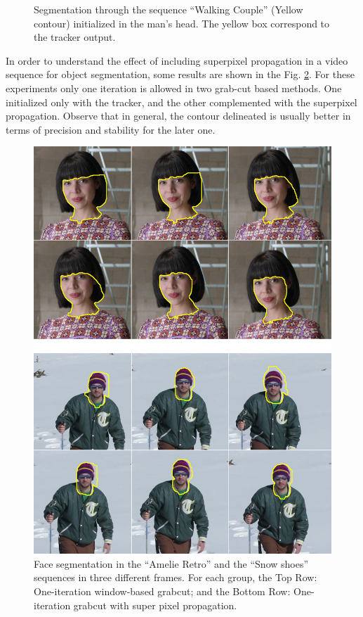 \begin{figure}[thpb]
      \caption{Segmentation through the sequence “Walking
	       Couple” (Yellow contour) initialized in the man’s head. The yellow box correspond to the tracker output.}
      \label{figurelabel_walking}
   \end{figure}

In order to understand the effect of including superpixel propagation in a video sequence for object
segmentation, some results are shown in the Fig. \ref{figurelabel_comp}. For these experiments only one iteration is
allowed in two grab-cut based methods. One initialized only with the tracker, and the other complemented with the superpixel
propagation. Observe that in general, the contour delineated is usually better in terms of precision and
stability for the later one.
   \begin{figure}[thpb]
      \centering
      \includegraphics[height=0.66\textheight]{images/Compare.png}
      \caption{Face segmentation in the “Amelie Retro” and the
	      “Snow shoes” sequences in three different frames. For each
	       group, the Top Row: One-iteration window-based grabcut;
	       and the Bottom Row: One-iteration grabcut with super pixel
	       propagation.}
      \label{figurelabel_comp}
   \end{figure}